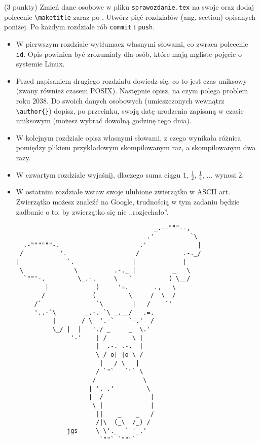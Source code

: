 \begin{zadanie}{(3 punkty)}
Zmień dane osobowe w pliku \verb+sprawozdanie.tex+ na swoje oraz dodaj polecenie  \verb+\maketitle+ zaraz po \verb++. 
Utwórz pięć rozdziałów (ang. section) opisanych poniżej. Po każdym rozdziale rób \verb+commit+ i \verb+push+.
\begin{itemize}
\item  W pierwszym rozdziale wytłumacz własnymi słowami, co zwraca polecenie \verb+id+. Opis powinien być zrozumiały dla osób, które mają mgliste pojęcie o systemie Linux.
\item Przed napisaniem drugiego rozdziału dowiedz się, co to jest czas uniksowy (zwany również czasem POSIX). Następnie opisz, na czym polega problem roku 2038. Do swoich danych osobowych (umieszczonych wewnątrz \verb+\author{}+) dopisz, po przecinku, swoją datę urodzenia zapisaną w czasie uniksowym (możesz wybrać dowolną godzinę tego dnia).
\item W kolejnym rozdziale opisz własnymi słowami, z czego wynikała różnica pomiędzy plikiem przykładowym skompilowanym raz, a skompilowanym dwa razy.
\item W czwartym rozdziale wyjaśnij, dlaczego suma ciągu $1$, $\frac{1}{2}$, $\frac{1}{4}$, $\dots$ wynosi $2$.
\item W ostatnim rozdziale wstaw swoje ulubione zwierzątko w ASCII art. Zwierzątko możesz znaleźć na Google, trudnością w tym zadaniu będzie zadbanie o to, by zwierzątko się nie ,,rozjechało''.
{\tiny
\begin{verbatim}
                                      _.--"""--,
                                    .'          `\
  .-""""""-.                      .'              |
 /          '.                   /            .-._/
|             `.                |             |
 \              \          .-._ |          _   \
  `""'-.         \_.-.     \   `          ( \__/
        |             )     '=.       .,   \  
       /             (         \     /  \  /
     /`               `\        |   /    `'
     '..-`\        _.-. `\ _.__/   .=.
          |  _    / \  '.-`    `-.'  /
          \_/ |  |   './ _     _  \.'
               '-'    | /       \ |  
                      |  .-. .-.  |
                      \ / o| |o \ /
                       |   / \   |
                      / `"`   `"` \
                     /             \
                    | '._.'         \
                    |  /             |
                     \ |             |
                      ||    _    _   /
                      /|\  (_\  /_) /
              jgs     \ \'._  ` '_.'
                       `""` `"""` 
\end{verbatim}
}
\end{itemize}
\end{zadanie}

